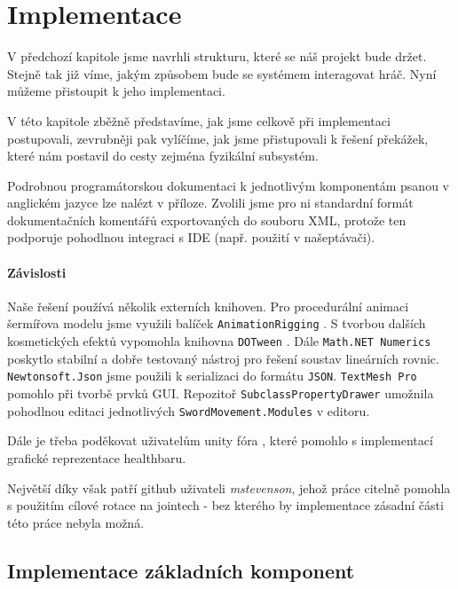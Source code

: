 \chapter{Implementace}

V předchozí kapitole jsme navrhli strukturu, které se náš projekt bude držet. Stejně tak již víme, jakým způsobem bude se systémem interagovat hráč. Nyní můžeme přistoupit k jeho implementaci.

V této kapitole zběžně představíme, jak jsme celkově při implementaci postupovali, zevrubněji pak vylíčíme, jak jsme přistupovali k řešení překážek, které nám postavil do cesty zejména fyzikální subsystém. 

Podrobnou programátorskou dokumentaci k jednotlivým komponentám psanou v anglickém jazyce lze nalézt v příloze. Zvolili jsme pro ni standardní formát dokumentačních komentářů exportovaných do souboru XML, protože ten podporuje pohodlnou integraci s IDE (např. použití v našeptávači).

\subsubsection*{Závislosti}
Naše řešení používá několik externích knihoven. Pro procedurální animaci šermířova modelu jsme využili balíček \texttt{AnimationRigging} \cite{AnimationRigging}. S tvorbou dalších kosmetických efektů vypomohla knihovna \texttt{DOTween} \cite{DoTween}. Dále \texttt{Math.NET Numerics} \cite{MathDotNetNumerics} poskytlo stabilní a dobře testovaný nástroj pro řešení soustav lineárních rovnic. \texttt{Newtonsoft.Json} \cite{NewtonsoftJson} jsme použili k serializaci do formátu \texttt{JSON}. \texttt{TextMesh Pro} \cite{TextMeshPro} pomohlo při tvorbě prvků GUI. Repozitoř \texttt{SubclassPropertyDrawer} \cite{SubclassPropertyDrawer} umožnila pohodlnou editaci jednotlivých \texttt{SwordMovement.Modules} v editoru. 

Dále je třeba poděkovat uživatelům unity fóra \cite{InvertReverseUIMask}, které pomohlo s implementací grafické reprezentace healthbaru.

Největší díky však patří github uživateli \textit{mstevenson}, jehož práce \cite{ConfigurableJointExtensions} citelně pomohla s použitím cílové rotace na jointech - bez kterého by implementace zásadní části této práce nebyla možná.


\section{Implementace základních komponent}

